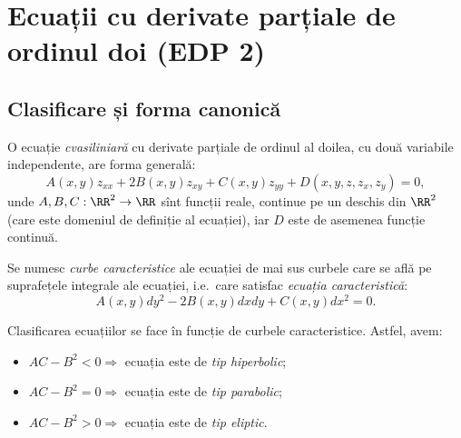 \chapter{Ecuații cu derivate parțiale de ordinul doi (EDP 2)}

\section{Clasificare și forma canonică}
O ecuație \emph{cvasiliniară} cu derivate parțiale de ordinul al doilea,
cu două variabile independente, are forma generală:
\[
    A(x, y) z_{xx} + 2B(x, y) z_{xy} + C(x, y) z_{yy} + D(x, y, z, z_x, z_y) = 0,
\]
unde $ A, B, C : \RR^2 \to \RR$ sînt funcții reale, continue pe un deschis
din $ \RR^2 $ (care este domeniul de definiție al ecuației), iar $ D $ este
de asemenea funcție continuă.
\begin{definition}\label{def:curbe-car}
    Se numesc \emph{curbe caracteristice} ale ecuației de mai sus curbele care se
    află pe suprafețele integrale ale ecuației, i.e.\ care satisfac
    \emph{ecuația caracteristică}:
    \[
        A(x, y) dy^2 - 2B(x, y) dxdy + C(x, y) dx^2 = 0.
    \]
\end{definition}

Clasificarea ecuațiilor se face în funcție de curbele caracteristice.
Astfel, avem:
\begin{itemize}
    \item $ AC - B^2 < 0 \Rightarrow $ ecuația este de \emph{tip hiperbolic};
    \item $ AC - B^2 = 0 \Rightarrow $ ecuația este de \emph{tip parabolic};
    \item $ AC - B^2 > 0 \Rightarrow $ ecuația este de \emph{tip eliptic}.
\end{itemize}


